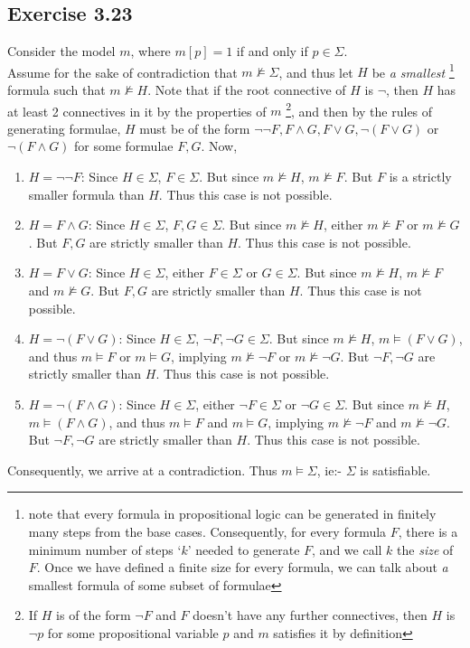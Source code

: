 \documentclass{article}
\begin{document}
\subsection*{Exercise 3.23}
Consider the model $m$, where $m[p] = 1$ if and only if $p\in\Sigma$. \\
Assume for the sake of contradiction that $m\not\models\Sigma$, and thus let $H$ be \emph{a smallest} \footnote{note that every formula in propositional logic can be generated in finitely many steps from the base cases. Consequently, for every formula $F$, there is a minimum number of steps `$k$' needed to generate $F$, and we call $k$ the \emph{size} of $F$. Once we have defined a finite size for every formula, we can talk about \emph{a} smallest formula of some subset of formulae} formula such that $m\not\models H$. Note that if the root connective of $H$ is $\lnot$, then $H$ has at least 2 connectives in it by the properties of $m$ \footnote{If $H$ is of the form $\lnot F$ and $F$ doesn't have any further connectives, then $H$ is $\lnot p$ for some propositional variable $p$ and $m$ satisfies it by definition}, and then by the rules of generating formulae, $H$ must be of the form $\lnot\lnot F, F\wedge G, F\lor G, \lnot(F\lor G)$ or $\lnot(F\wedge G)$ for some formulae $F, G$. Now, 
\begin{enumerate}
    \item $H = \lnot\lnot F$: Since $H\in\Sigma$, $F\in\Sigma$. But since $m\not\models H$, $m\not\models F$. But $F$ is a strictly smaller formula than $H$. Thus this case is not possible.
    \item $H = F\wedge G$: Since $H\in\Sigma$, $F, G\in\Sigma$. But since $m\not\models H$, either $m\not\models F$ or $m\not\models G$. But $F, G$ are strictly smaller than $H$. Thus this case is not possible.
    \item $H = F\lor G$: Since $H\in\Sigma$, either $F\in\Sigma$ or $G\in\Sigma$. But since $m\not\models H$, $m\not\models F$ and $m\not\models G$. But $F, G$ are strictly smaller than $H$. Thus this case is not possible.
    \item $H = \lnot(F\lor G)$: Since $H\in\Sigma$, $\lnot F, \lnot G\in\Sigma$. But since $m\not\models H$, $m\models (F\lor G)$, and thus $m\models F$ or $m\models G$, implying $m\not\models \lnot F$ or $m\not\models \lnot G$. But $\lnot F, \lnot G$ are strictly smaller than $H$. Thus this case is not possible.
    \item $H = \lnot(F\wedge G)$: Since $H\in\Sigma$, either $\lnot F\in\Sigma$ or $\lnot G\in\Sigma$. But since $m\not\models H$, $m\models (F\wedge G)$, and thus $m\models F$ and $m\models G$, implying $m\not\models \lnot F$ and $m\not\models \lnot G$. But $\lnot F, \lnot G$ are strictly smaller than $H$. Thus this case is not possible.
\end{enumerate}
Consequently, we arrive at a contradiction. Thus $m\models\Sigma$, ie:- $\Sigma$ is satisfiable.
\end{document}
